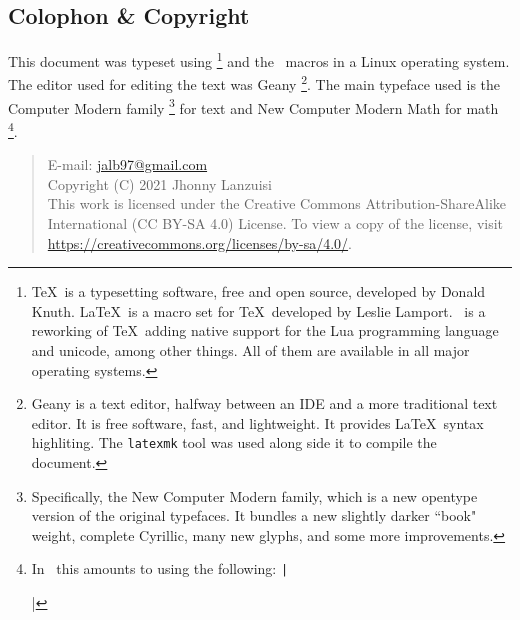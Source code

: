 \newpage
\begin{small}
    \begin{center}
    \begin{minipage}{0.4\paperwidth}
        \section*{Colophon \& Copyright}
        This document was typeset using \LuaTeX%
        \footnote{%
            \TeX\ is
            a typesetting software, free and open source,
            developed by Donald Knuth. \LaTeX\ is a macro
            set for \TeX\ developed by Leslie Lamport. \LuaTeX\ is
            a reworking of \TeX\ adding native support for the Lua
            programming language and unicode, among other things.
            All of them are available in all major
            operating systems.
        }
        and the \LaTeXe\ macros in a Linux operating system.
        The editor used for editing the text was Geany%
        \footnote{%
            Geany is a text editor, halfway between an IDE
            and a more traditional text editor.
            It is free software, fast, and lightweight.
            It provides \LaTeX\ syntax highliting.
            The \texttt{latexmk} tool was used along side it
            to compile the document.
        }.
        The main typeface used is the Computer Modern family%
        \footnote{%
            Specifically, the New Computer Modern family,
            which is a new opentype version of the original
            typefaces. It bundles a new slightly darker ``book"
            weight, complete Cyrillic, many new glyphs, 
            and some more improvements.
        }
        for text and New Computer Modern Math for math%
        \footnote{%
            In \LuaLaTeX\ this amounts to using the following:
            \texttt|\usepackage[default]{fontsetup}|
        }.

        \medskip
        \begin{quote}\ttfamily\raggedright\footnotesize%
            E-mail: \url{jalb97@gmail.com} \\
            Copyright (C) 2021 Jhonny Lanzuisi \\
            This work is licensed under the Creative Commons Attribution-ShareAlike
            International (CC BY-SA 4.0)  License. To view a copy of the license,
            visit \url{https://creativecommons.org/licenses/by-sa/4.0/}.
        \end{quote}
    \end{minipage}
    \end{center}
\end{small}
\newpage
\tableofcontents
